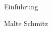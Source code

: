 
\begin{frame}
  \begin{center}
    \vskip1cm
    {\bfseries\color{maincolor}{\fontsize{72pt}{72pt}\selectfont\rmfamily\LaTeX}
    \par\vskip5mm
    \Huge Einführung}
    \par\vskip12mm
    \large Malte Schmitz
  \end{center}
\end{frame}